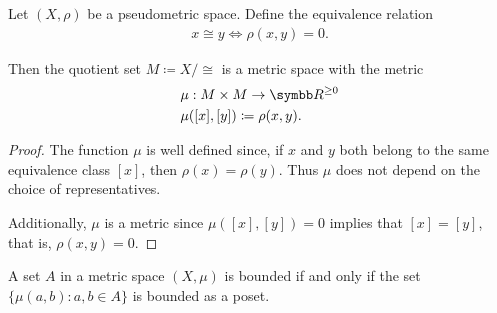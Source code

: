 \begin{proposition}\label{thm:pseudometric_to_metric}
  Let \( (X, \rho) \) be a pseudometric space. Define the equivalence relation
  \begin{align*}
    x \cong y \iff \rho(x, y) = 0.
  \end{align*}

  Then the quotient set \( M \coloneqq X / \cong \) is a metric space with the metric
  \begin{align*}
    &\mu: M \times M \to \BB{R}^{\geq 0} \\
    &\mu([x], [y]) \coloneqq \rho(x, y).
  \end{align*}
\end{proposition}
\begin{proof}
  The function \( \mu \) is well defined since, if \( x \) and \( y \) both belong to the same equivalence class \( [x] \), then \( \rho(x) = \rho(y) \). Thus \( \mu \) does not depend on the choice of representatives.

  Additionally, \( \mu \) is a metric since \( \mu([x], [y]) = 0 \) implies that \( [x] = [y] \), that is, \( \rho(x, y) = 0 \).
\end{proof}

\begin{proposition}\label{note:bounded_set_metric_order_equivalence}
  A set \( A \) in a metric space \( (X, \mu) \) is bounded if and only if the set \( \{ \mu(a, b) \colon a, b \in A \} \) is bounded as a poset.
\end{proposition}

